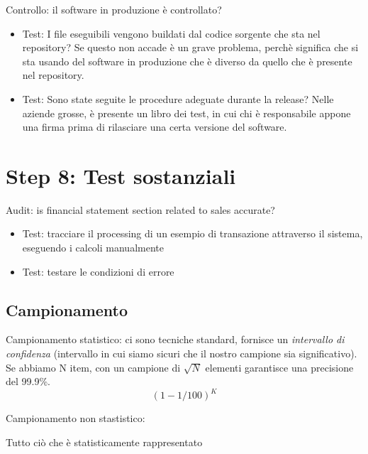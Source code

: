 Controllo: il software in produzione è controllato?
\begin{itemize}
\item Test: I file eseguibili vengono buildati dal codice sorgente che sta nel 
repository? Se questo non accade è un grave problema, perchè significa che si 
sta usando del software in produzione che è diverso da quello che è presente nel 
repository.
\item Test: Sono state seguite le procedure adeguate durante la release? Nelle 
aziende grosse, è presente un libro dei test, in cui chi è responsabile appone 
una firma prima di rilasciare una certa versione del software.
\end{itemize}


\section{Step 8: Test sostanziali}

Audit: is financial statement section related to sales accurate? 

\begin{itemize}
\item Test: tracciare il processing di un esempio di transazione attraverso il 
sistema, eseguendo i calcoli manualmente
\item Test: testare le condizioni di errore
\end{itemize}



\subsection{Campionamento}

Campionamento statistico: ci sono tecniche standard, fornisce un 
\textit{intervallo di confidenza} (intervallo in cui siamo sicuri che il nostro 
campione sia significativo). Se abbiamo N item, con un campione di $\sqrt{N}$ 
elementi garantisce una precisione del 99.9\%.
$$
(1 - 1/100)^K
$$

Campionamento non stastistico:

Tutto ciò che è statisticamente rappresentato